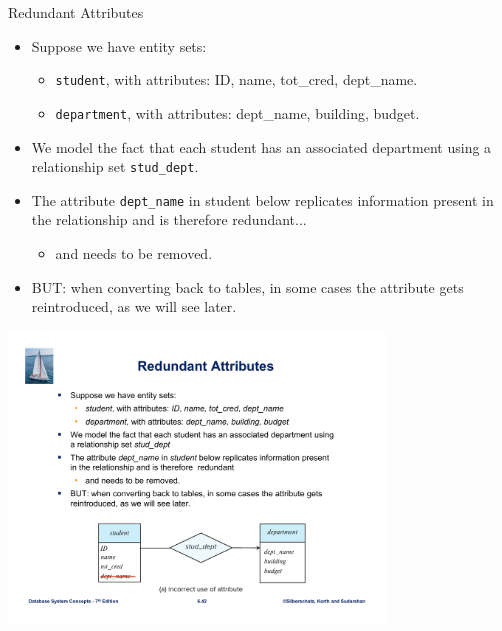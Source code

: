 \documentclass{beamer}
\begin{document}
\begin{frame}{Redundant Attributes}
    \begin{itemize}
        \item Suppose we have entity sets:
        \begin{itemize}
            \item \texttt{student}, with attributes: ID, name, tot\_cred, dept\_name.
            \item \texttt{department}, with attributes: dept\_name, building, budget.
        \end{itemize}
        \item We model the fact that each student has an associated department using a relationship set \texttt{stud\_dept}.
        \item The attribute \texttt{dept\_name} in student below replicates information present in the relationship and is therefore redundant...
        \begin{itemize}
            \item and needs to be removed.
        \end{itemize}
        \item BUT: when converting back to tables, in some cases the attribute gets reintroduced, as we will see later.
    \end{itemize}
    \centering
    \includegraphics[trim={5cm 2cm 5cm 13.5cm}, clip, width=0.75\textwidth]{figures/redundant_attr}
\end{frame}
\end{document}
